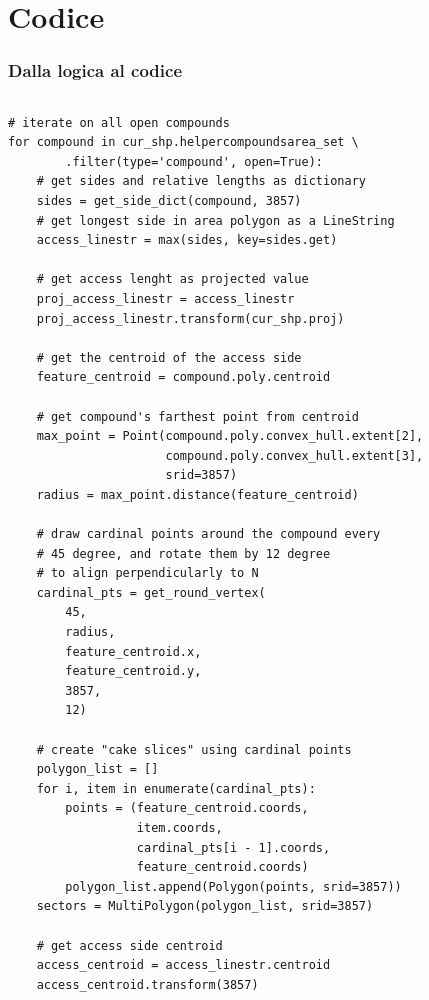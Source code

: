 \documentclass[xcolor=svgnames]{beamer}
\begin{document}
    \lstset{
        language=python,
        numbers=left,
        numberstyle=\tiny,
        showstringspaces=false,
        aboveskip=-40pt,
        frame=leftline,
        basicstyle=\tiny
    }

    \section{Codice}

        \begin{frame}[fragile]
        \frametitle{Dalla logica al codice}     %
            \begin{columns}[c]
                \centering
                    \resizebox{1\textwidth}{!}{%
                        
                    }
                \begin{adjustbox}{width=0.9\textwidth,keepaspectratio}
                    \begin{lstlisting}
# iterate on all open compounds
for compound in cur_shp.helpercompoundsarea_set \
        .filter(type='compound', open=True):
    # get sides and relative lengths as dictionary
    sides = get_side_dict(compound, 3857)
    # get longest side in area polygon as a LineString
    access_linestr = max(sides, key=sides.get)

    # get access lenght as projected value
    proj_access_linestr = access_linestr
    proj_access_linestr.transform(cur_shp.proj)

    # get the centroid of the access side
    feature_centroid = compound.poly.centroid

    # get compound's farthest point from centroid
    max_point = Point(compound.poly.convex_hull.extent[2],
                      compound.poly.convex_hull.extent[3],
                      srid=3857)
    radius = max_point.distance(feature_centroid)

    # draw cardinal points around the compound every 
    # 45 degree, and rotate them by 12 degree 
    # to align perpendicularly to N
    cardinal_pts = get_round_vertex(
        45,
        radius,
        feature_centroid.x,
        feature_centroid.y,
        3857,
        12)

    # create "cake slices" using cardinal points
    polygon_list = []
    for i, item in enumerate(cardinal_pts):
        points = (feature_centroid.coords,
                  item.coords,
                  cardinal_pts[i - 1].coords,
                  feature_centroid.coords)
        polygon_list.append(Polygon(points, srid=3857))
    sectors = MultiPolygon(polygon_list, srid=3857)

    # get access side centroid
    access_centroid = access_linestr.centroid
    access_centroid.transform(3857)
                    \end{lstlisting}
                \end{adjustbox}
            \end{columns}
\end{frame} 
\end{document}
